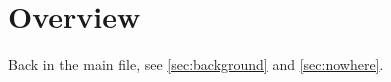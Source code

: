 \documentclass{book}
\begin{document}
\chapter{Overview}
\label{chap:overview}


Back in the main file, see \ref{sec:background} and \ref{sec:nowhere}.
\end{document}
